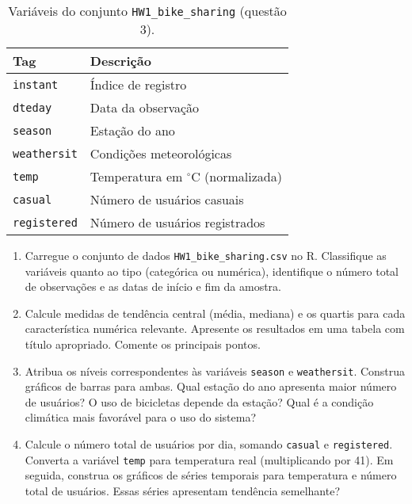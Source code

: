 \documentclass[a4paper,11pt]{article}
\begin{document}
\begin{table}[h] \centering
\begin{tabular}{l | p{6cm} }
{\sc Tag} 		& {\sc Descrição} 							\\ \hline \hline
{\tt instant}     	& Índice de registro                       				\\
{\tt dteday}      	& Data da observação                            			\\
{\tt season}      	& Estação do ano                                			\\
{\tt weathersit}  & Condições meteorológicas                      		\\
{\tt temp}        	& Temperatura em $^\circ$C (normalizada)      	 	\\
{\tt casual}      	& Número de usuários casuais                    		\\
{\tt registered}  	& Número de usuários registrados                		\\
\end{tabular}
\caption{Variáveis do conjunto {\tt HW1\_bike\_sharing} (questão 3).}
\label{tab:ex3}
\end{table}

\vspace{0.5em}
\begin{enumerate}[leftmargin=*]

\item Carregue o conjunto de dados {\tt HW1\_bike\_sharing.csv} no R. Classifique as variáveis quanto ao tipo (categórica ou numérica), identifique o número total de observações e as datas de início e fim da amostra.  

\item Calcule medidas de tendência central (média, mediana) e os quartis para cada característica numérica relevante. Apresente os resultados em uma tabela com título apropriado. Comente os principais pontos.

\item Atribua os níveis correspondentes às variáveis {\tt season} e {\tt weathersit}. Construa gráficos de barras para ambas. Qual estação do ano apresenta maior número de usuários? O uso de bicicletas depende da estação? Qual é a condição climática mais favorável para o uso do sistema?

\item Calcule o número total de usuários por dia, somando {\tt casual} e {\tt registered}. Converta a variável {\tt temp} para temperatura real (multiplicando por 41). Em seguida, construa os gráficos de séries temporais para temperatura e número total de usuários. Essas séries apresentam tendência semelhante?
\end{enumerate}
\end{document}
